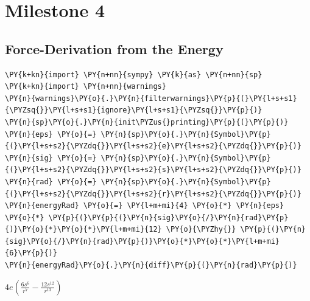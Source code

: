 \chapter{Milestone 4}
\section{Force-Derivation from the Energy}
    \begin{tcolorbox}[breakable, size=fbox, boxrule=1pt, pad at break*=1mm,colback=cellbackground, colframe=cellborder]
\begin{Verbatim}[commandchars=\\\{\}]
\PY{k+kn}{import} \PY{n+nn}{sympy} \PY{k}{as} \PY{n+nn}{sp}
\PY{k+kn}{import} \PY{n+nn}{warnings}
\PY{n}{warnings}\PY{o}{.}\PY{n}{filterwarnings}\PY{p}{(}\PY{l+s+s1}{\PYZsq{}}\PY{l+s+s1}{ignore}\PY{l+s+s1}{\PYZsq{}}\PY{p}{)}
\PY{n}{sp}\PY{o}{.}\PY{n}{init\PYZus{}printing}\PY{p}{(}\PY{p}{)}
\PY{n}{eps} \PY{o}{=} \PY{n}{sp}\PY{o}{.}\PY{n}{Symbol}\PY{p}{(}\PY{l+s+s2}{\PYZdq{}}\PY{l+s+s2}{e}\PY{l+s+s2}{\PYZdq{}}\PY{p}{)}
\PY{n}{sig} \PY{o}{=} \PY{n}{sp}\PY{o}{.}\PY{n}{Symbol}\PY{p}{(}\PY{l+s+s2}{\PYZdq{}}\PY{l+s+s2}{s}\PY{l+s+s2}{\PYZdq{}}\PY{p}{)}
\PY{n}{rad} \PY{o}{=} \PY{n}{sp}\PY{o}{.}\PY{n}{Symbol}\PY{p}{(}\PY{l+s+s2}{\PYZdq{}}\PY{l+s+s2}{r}\PY{l+s+s2}{\PYZdq{}}\PY{p}{)}
\PY{n}{energyRad} \PY{o}{=} \PY{l+m+mi}{4} \PY{o}{*} \PY{n}{eps} \PY{o}{*} \PY{p}{(}\PY{p}{(}\PY{n}{sig}\PY{o}{/}\PY{n}{rad}\PY{p}{)}\PY{o}{*}\PY{o}{*}\PY{l+m+mi}{12} \PY{o}{\PYZhy{}} \PY{p}{(}\PY{n}{sig}\PY{o}{/}\PY{n}{rad}\PY{p}{)}\PY{o}{*}\PY{o}{*}\PY{l+m+mi}{6}\PY{p}{)}
\PY{n}{energyRad}\PY{o}{.}\PY{n}{diff}\PY{p}{(}\PY{n}{rad}\PY{p}{)}
\end{Verbatim}
\end{tcolorbox}



    $\displaystyle 4 e \left(\frac{6 s^{6}}{r^{7}} - \frac{12 s^{12}}{r^{13}}\right)$



